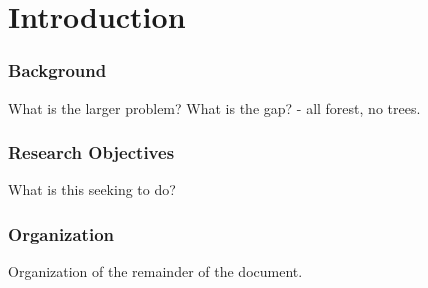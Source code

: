 \chapter{Introduction}

\subsection{Background}
What is the larger problem?  What is the gap?  - all forest, no trees.

\subsection{Research Objectives}
What is this seeking to do?

\subsection{Organization}
Organization of the remainder of the document.